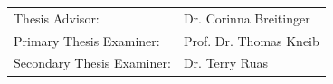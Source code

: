 \begin{titlepage}
    \vspace{1.0cm}

    \begin{tabular}{@{}ll}
        Thesis Advisor:            & Dr. Corinna Breitinger \\
        Primary Thesis Examiner:   & Prof. Dr. Thomas Kneib \\
        Secondary Thesis Examiner: & Dr. Terry Ruas         \\
    \end{tabular}

    \clearpage
\end{titlepage}

